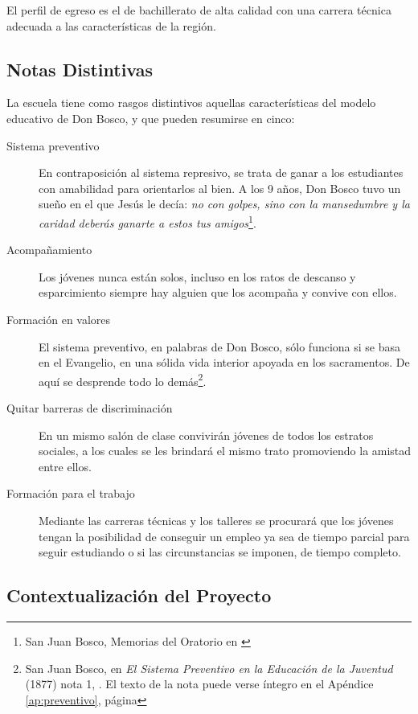 El perfil de egreso es el de bachillerato de alta calidad con una carrera técnica adecuada a las características de la región.

\subsection{Notas Distintivas}
\label{sub:intro:NotasDistintivas}

La escuela tiene como rasgos distintivos aquellas características del modelo educativo de Don Bosco, y que pueden resumirse en cinco:

\begin{description}
	\item[Sistema preventivo] En contraposición al sistema represivo, se trata de ganar a los estudiantes con amabilidad para orientarlos al bien. A los 9 años, Don Bosco tuvo un sueño en el que Jesús le decía: \emph{no con golpes, sino con la mansedumbre y la caridad deberás ganarte a estos tus amigos}\footnote{San Juan Bosco, Memorias del Oratorio en \citep{Canals95}}.

	\item[Acompañamiento] Los jóvenes nunca están solos, incluso en los ratos de descanso y esparcimiento siempre hay alguien que los acompaña y convive con ellos.
	
	\item[Formación en valores] El sistema preventivo, en palabras de Don Bosco, sólo funciona si se basa en el Evangelio, en una sólida vida interior apoyada en los sacramentos. De aquí se desprende todo lo demás\footnote{San Juan Bosco, en \emph{El Sistema Preventivo en la Educación de la Juventud} (1877) nota 1, \citep{Canals95}. El texto de la nota puede verse íntegro en el Apéndice \ref{ap:preventivo}, página \pageref{ap:preventivo}}.

	\item[Quitar barreras de discriminación] En un mismo salón de clase convivirán jóvenes de todos los estratos sociales, a los cuales se les brindará el mismo trato promoviendo la amistad entre ellos.

	\item[Formación para el trabajo] Mediante las carreras técnicas y los talleres se procurará que los jóvenes tengan la posibilidad de conseguir un empleo ya sea de tiempo parcial para seguir estudiando o si las circunstancias se imponen, de tiempo completo.
\end{description}

\subsection{Contextualización del Proyecto}

